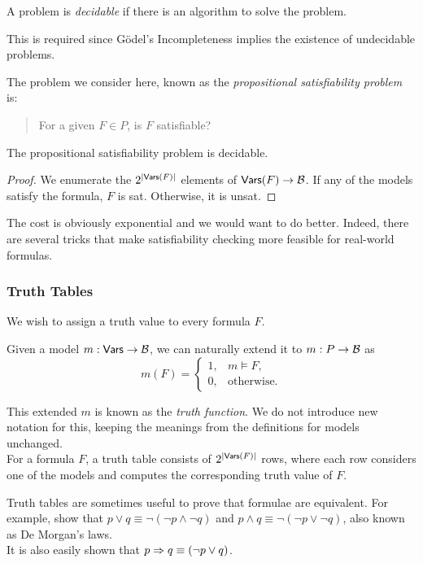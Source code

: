 \begin{fdef}
A problem is \textit{decidable} if there is an algorithm to solve the problem.
\end{fdef}

This is required since G\"odel's Incompleteness implies the existence of undecidable problems.

The problem we consider here, known as the \textit{propositional satisfiability problem} is:
\begin{quote}
For a given $F\in P$, is $F$ satisfiable?
\end{quote}

\begin{theorem}
The propositional satisfiability problem is decidable.
\end{theorem}
\begin{proof}
We enumerate the $2^{|\mathsf{Vars}(F)|}$ elements of $\mathsf{Vars}(F)\to\mathcal{B}$. If any of the models satisfy the formula, $F$ is sat. Otherwise, it is unsat.
\end{proof}

The cost is obviously exponential and we would want to do better. Indeed, there are several tricks that make satisfiability checking more feasible for real-world formulas.

\subsubsection{Truth Tables}

We wish to assign a truth value to every formula $F$.

Given a model $m:\mathsf{Vars}\to\mathcal{B}$, we can naturally extend it to $m:P\to \mathcal{B}$ as
\[
	m(F) = 
	\begin{cases}
	1, & m\vDash F, \\
	0, & \text{otherwise.}
	\end{cases}
\]

This extended $m$ is known as the \textit{truth function}. We do not introduce new notation for this, keeping the meanings from the definitions for models unchanged.\\

For a formula $F$, a truth table consists of $2^{|\mathsf{Vars}(F)|}$ rows, where each row considers one of the models and computes the corresponding truth value of $F$.

Truth tables are sometimes useful to prove that formulae are equivalent. For example, show that $p\vee q \equiv \neg(\neg p \wedge \neg q)$ and $p\wedge q \equiv \neg(\neg p \vee \neg q)$, also known as De Morgan's laws.\\
It is also easily shown that $p\Rightarrow q \equiv (\neg p \vee q)$.

